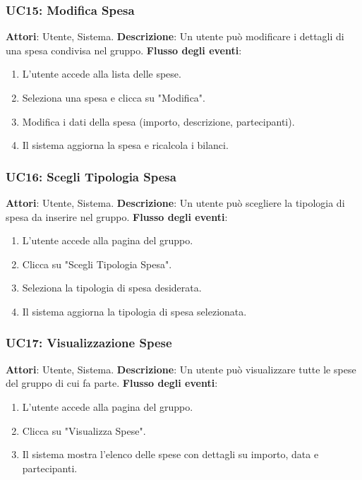 \subsubsection{UC15: Modifica Spesa}
\textbf{Attori}: Utente, Sistema.
\newline
\newline
\textbf{Descrizione}: Un utente può modificare i dettagli di una spesa condivisa nel gruppo.
\newline
\newline
\textbf{Flusso degli eventi}:
\begin{enumerate}
    \item L’utente accede alla lista delle spese.
    \item Seleziona una spesa e clicca su "Modifica".
    \item Modifica i dati della spesa (importo, descrizione, partecipanti).
    \item Il sistema aggiorna la spesa e ricalcola i bilanci.
\end{enumerate}

\subsubsection{UC16: Scegli Tipologia Spesa}
\textbf{Attori}: Utente, Sistema.
\newline
\newline
\textbf{Descrizione}: Un utente può scegliere la tipologia di spesa da inserire nel gruppo.
\newline
\newline
\textbf{Flusso degli eventi}:
\begin{enumerate}
    \item L’utente accede alla pagina del gruppo.
    \item Clicca su "Scegli Tipologia Spesa".
    \item Seleziona la tipologia di spesa desiderata.
    \item Il sistema aggiorna la tipologia di spesa selezionata.
\end{enumerate}

\subsubsection{UC17: Visualizzazione Spese}
\textbf{Attori}: Utente, Sistema.
\newline
\newline
\textbf{Descrizione}: Un utente può visualizzare tutte le spese del gruppo di cui fa parte.
\newline
\newline
\textbf{Flusso degli eventi}:
\begin{enumerate}
    \item L’utente accede alla pagina del gruppo.
    \item Clicca su "Visualizza Spese".
    \item Il sistema mostra l’elenco delle spese con dettagli su importo, data e partecipanti.
\end{enumerate}

